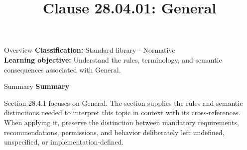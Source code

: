 \documentclass[10pt,letterpaper]{article}
\title{Clause 28.04.01: General}
\author{}
\date{}
\begin{document}
\maketitle
\begin{CornellOverviewBox}{Overview}
\textbf{Classification:} Standard library - Normative\\[2pt]
\textbf{Learning objective:} Understand the rules, terminology, and semantic consequences associated with General.
\end{CornellOverviewBox}\begin{CornellSummaryBox}{Summary}
{\sffamily\bfseries\color{Accent} Summary}\par\vspace{3pt}Section 28.4.1 focuses on General. The section supplies the rules and semantic distinctions needed to interpret this topic in context with its cross-references. When applying it, preserve the distinction between mandatory requirements, recommendations, permissions, and behavior deliberately left undefined, unspecified, or implementation-defined.
\end{CornellSummaryBox}
\end{document}
